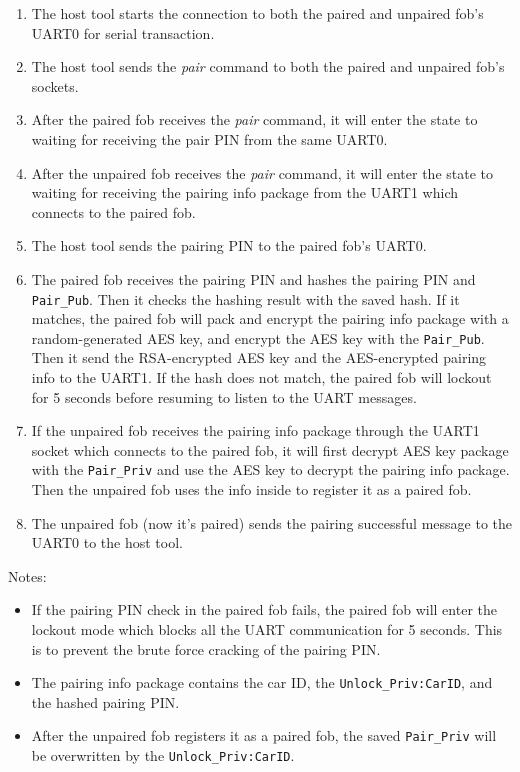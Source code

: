 \documentclass[11pt,oneside,onecolumn,letterpaper]{article}
\begin{document}
\begin{enumerate}
	\item The host tool starts the connection to both the paired and unpaired fob's UART0 for serial transaction.
	\item The host tool sends the \textit{pair} command to both the paired and unpaired fob's sockets.
	\item After the paired fob receives the \textit{pair} command, it will enter the state to waiting for receiving the pair PIN from the same UART0.
	\item After the unpaired fob receives the \textit{pair} command, it will enter the state to waiting for receiving the pairing info package from the UART1 which connects to the paired fob.
	\item The host tool sends the pairing PIN to the paired fob's UART0.
	\item The paired fob receives the pairing PIN and hashes the pairing PIN and \verb|Pair_Pub|. Then it checks the hashing result with the saved hash. If it matches, the paired fob will pack and encrypt the pairing info package with a random-generated AES key, and encrypt the AES key with the \verb|Pair_Pub|. Then it send the RSA-encrypted AES key and the AES-encrypted pairing info to the UART1. If the hash does not match, the paired fob will lockout for 5 seconds before resuming to listen to the UART messages.
	\item If the unpaired fob receives the pairing info package through the UART1 socket which connects to the paired fob, it will first decrypt AES key package with the \verb|Pair_Priv| and use the AES key to decrypt the pairing info package. Then the unpaired fob uses the info inside to register it as a paired fob.
	\item The unpaired fob (now it's paired) sends the pairing successful message to the UART0 to the host tool.
\end{enumerate}

Notes:
\begin{itemize}
	\item If the pairing PIN check in the paired fob fails, the paired fob will enter the lockout mode which blocks all the UART communication for 5 seconds. This is to prevent the brute force cracking of the pairing PIN.
	\item The pairing info package contains the car ID, the \verb|Unlock_Priv:CarID|, and the hashed pairing PIN.
	\item After the unpaired fob registers it as a paired fob, the saved \verb|Pair_Priv| will be overwritten by the \verb|Unlock_Priv:CarID|.
\end{itemize}
\end{document}
